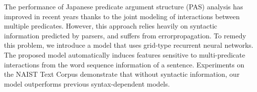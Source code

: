 The performance of Japanese predicate argument structure (PAS) analysis has improved in recent years thanks to the joint modeling of interactions between multiple predicates. However, this approach relies heavily on syntactic information predicted by parsers, and suffers from errorpropagation. To remedy this problem, we introduce a model that uses grid-type recurrent neural networks. The proposed model automatically induces features sensitive to multi-predicate interactions from the word sequence information of a sentence. Experiments on the NAIST Text Corpus demonstrate that without syntactic information, our model outperforms previous syntax-dependent models.
